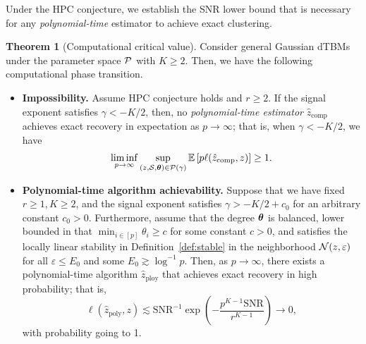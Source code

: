 \documentclass[journal]{IEEEtran}
\theoremstyle{definition}
\newtheorem{thm}{Theorem}
\theoremstyle{definition}
\newcommand{\of}[1]{\left(#1\right)}
\begin{document}
Under the HPC conjecture, we establish the SNR lower bound that is necessary for any \emph{polynomial-time} estimator to achieve exact clustering.

\begin{thm}[Computational critical value]\label{thm:comp} 
Consider general Gaussian dTBMs under the parameter space $\mathcal{P}$ with $K\geq 2$. Then, we have the following computational phase transition.

\begin{itemize}[wide]
    \item \textbf{Impossibility.} Assume HPC conjecture holds {and $r \geq 2$}. If the signal exponent satisfies $\gamma < -K/2$, then, no \emph{polynomial-time estimator} $\hat z_{\text{comp}}$ achieves exact recovery in expectation as $p\to \infty$; that is, when $\gamma<-K/2$, we have 
\begin{align}
   \liminf_{p\to \infty}\sup_{(z, \mathcal{S}, \boldsymbol{\theta}) \in \mathcal{P}(\gamma)}  \mathbb{E} \left[ p\ell(\hat z_{\text{comp}}, z) \right]\geq 1.
\end{align}
\item \textbf{Polynomial-time algorithm achievability.} Suppose that we have {fixed $r \geq 1, K \geq 2$}, and the signal exponent satisfies $\gamma  >  -K/2+c_0$ for an arbitrary constant {$c_0>0$}. Furthermore, assume that the degree $\boldsymbol{\theta}$ is balanced, lower bounded in that $\min_{i\in[p]}\theta_i\geq c$ for some constant $c>0$, and satisfies the locally linear stability in Definition~\ref{def:stable} {in the neighborhood $\mathcal{N}(z,\varepsilon)$ for all $\varepsilon \leq E_0$ and some $E_0 \gtrsim \log^{-1}p $.}
Then, {as $p \rightarrow \infty$}, there exists a polynomial-time algorithm $\hat z_{\text{ploy}}$ that achieves exact recovery in high probability; that is,
\begin{equation}
 \ell(\hat z_{\text{poly}}, z) \lesssim \text{SNR}^{-1}\exp \of{ - \frac{p^{K-1}\text{SNR}}{r^{K-1}} } \to 0,
\end{equation}
with probability going to 1. 
\end{itemize}
\end{thm}
\end{document}
